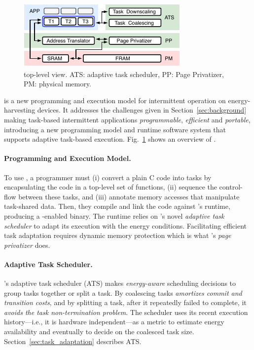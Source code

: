 \begin{figure}
	\centering
	\includegraphics[width=\columnwidth]{figures/system-overview.pdf}
	\caption{\sys top-level view. ATS: adaptive task scheduler, PP: Page Privatizer, PM: physical memory.}
	\label{fig:system_overview}
\end{figure}

\sys is a new programming and execution model for intermittent operation on energy-harvesting devices. It addresses the challenges given in Section~\ref{sec:background} making task-based intermittent applications {\em programmable}, {\em efficient} and {\em portable}, introducing a new programming model and runtime software system that supports adaptive task-based execution. Fig.~\ref{fig:system_overview} shows an overview of \sys.

\paragraph{Programming and Execution Model.}
To use \sys, a programmer must (i) convert a plain C code into tasks by encapsulating the code in a top-level set of functions, (ii) sequence the control-flow between these tasks, and (iii) annotate memory accesses that manipulate task-shared data. Then, they compile and link the code against \sys's runtime, producing a \sys-enabled binary. The runtime relies on \sys's novel {\em adaptive task scheduler} to adapt its execution with the energy conditions. Facilitating efficient task adaptation requires dynamic memory protection which is what \sys's \emph{page privatizer} does. 

\paragraph{Adaptive Task Scheduler.}
\sys's adaptive task scheduler (ATS) makes \emph{energy-aware} scheduling decisions to group tasks together or split a task. By coalescing tasks \sys \emph{amortizes commit and transition costs}, and by splitting a task, after it repeatedly failed to complete, it \emph{avoids the task non-termination problem}. The scheduler uses its recent execution history---i.e., it is hardware independent---as a metric to estimate energy availability and eventually to decide on the coalesced task size. Section~\ref{sec:task_adaptation} describes ATS.

